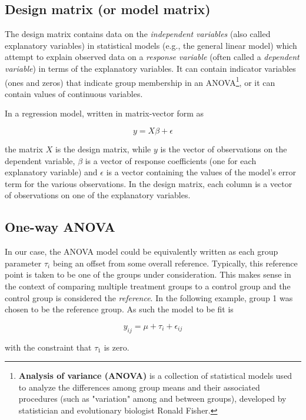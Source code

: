 \documentclass[oneside, a4paper, 11pt]{book}
\begin{document}
\subsection{Design matrix (or model matrix)}
The design matrix contains data on the \textit{independent variables} (also called explanatory variables) in statistical models (e.g., the general linear model) which attempt to explain observed data on a \textit{response variable} (often called a \textit{dependent variable}) in terms of the explanatory variables. It can contain indicator variables (ones and zeros) that indicate group membership in an ANOVA\footnote{\textbf{Analysis of variance (ANOVA)} is a collection of statistical models used to analyze the differences among group means and their associated procedures (such as "variation" among and between groups), developed by statistician and evolutionary biologist Ronald Fisher.}, or it can contain values of continuous variables.
\newline

In a regression model, written in matrix-vector form as

$$y=X\beta+ \epsilon$$

the matrix $X$ is the design matrix, while $y$ is the vector of observations on the dependent variable, $\beta$ is a vector of response coefficients (one for each explanatory variable) and $\epsilon$ is a vector containing the values of the model's error term for the various observations. In the design matrix, each column is a vector of observations on one of the explanatory variables.
\newline

\subsection{One-way ANOVA }
In our case, the ANOVA model could be equivalently written as each group parameter $\tau_i$ being an offset from some overall reference. Typically, this reference point is taken to be one of the groups under consideration. This makes sense in the context of comparing multiple treatment groups to a control group and the control group is considered the \textit{reference}. In the following example, group 1 was chosen to be the reference group. As such the model to be fit is

$$y_{ij} = \mu + \tau_i + \epsilon_{ij}$$

with the constraint that $\tau_1$ is zero.
\end{document}
